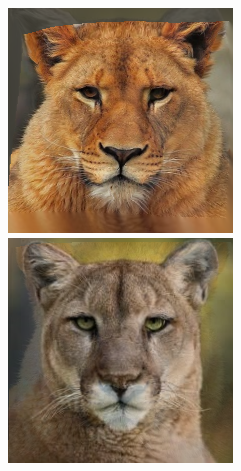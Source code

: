 \documentclass[conference]{IEEEtran}
\begin{document}
\begin{figure}[H]
\begin{multicols}{3}
    \includegraphics[width=1.0\linewidth]{TestsCats/G/img10.png} \par
    \includegraphics[width=1.0\linewidth]{TestsCats/G/img40.png} \par


\end{multicols}
\end{figure}
\end{document}
